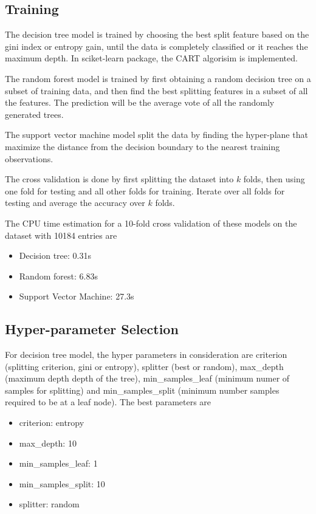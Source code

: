 \documentclass[12pt]{article}
\theoremstyle{definition}
\begin{document}
\subsection{Training}
The decision tree model is trained by choosing the best split feature based on the gini index or entropy gain, until the data is completely classified or it reaches the maximum depth. In sciket-learn package, the CART algorisim is implemented. 

The random forest model is trained by first obtaining a random decision tree on a subset of training data, and then find the best splitting features in a subset of all the features. The prediction will be the average vote of all the randomly generated trees.

The support vector machine model split the data by finding the hyper-plane that maximize the distance from the decision boundary to the nearest training observations.

The cross validation is done by first splitting the dataset into $k$ folds, then using one fold for testing and all other folds for training. Iterate over all folds for testing and average the accuracy over $k$ folds.

The CPU time estimation for a 10-fold cross validation of these models on the dataset with 10184 entries are
\begin{itemize}
    \item Decision tree: 0.31s
    \item Random forest: 6.83s
    \item Support Vector Machine: 27.3s
\end{itemize}

\subsection{Hyper-parameter Selection}
For decision tree model, the hyper parameters in consideration are criterion (splitting criterion, gini or entropy), splitter (best or random), max\_depth (maximum depth depth of the tree), min\_samples\_leaf (minimum numer of samples for splitting) and min\_samples\_split (minimum number samples required to be at a leaf node). The best parameters are
\begin{itemize}
    \item criterion: entropy
    \item max\_depth: 10
    \item min\_samples\_leaf: 1
    \item min\_samples\_split: 10
    \item splitter: random
\end{itemize}
\end{document}
